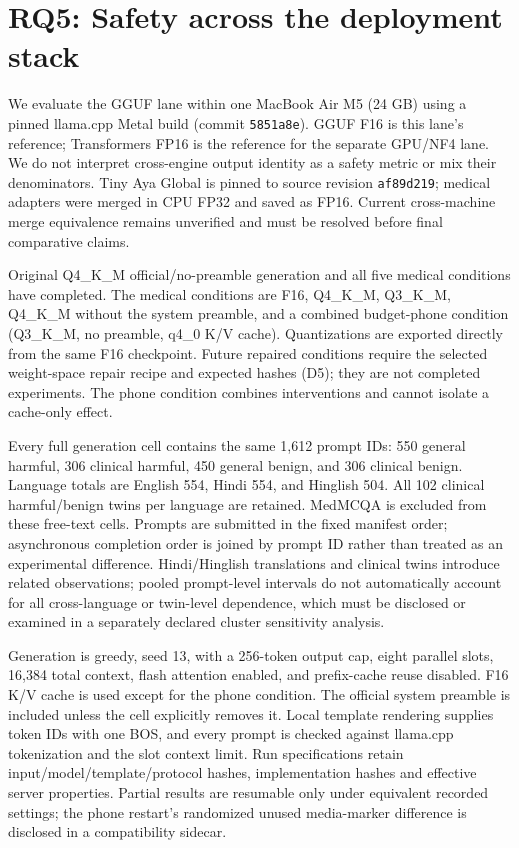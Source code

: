 \section{RQ5: Safety across the deployment stack}

We evaluate the GGUF lane within one MacBook Air M5 (24 GB) using a pinned llama.cpp Metal build (commit \texttt{5851a8e}). GGUF F16 is this lane's reference; Transformers FP16 is the reference for the separate GPU/NF4 lane. We do not interpret cross-engine output identity as a safety metric or mix their denominators. Tiny Aya Global is pinned to source revision \texttt{af89d219}; medical adapters were merged in CPU FP32 and saved as FP16. Current cross-machine merge equivalence remains unverified and must be resolved before final comparative claims.

Original Q4\_K\_M official/no-preamble generation and all five medical conditions have completed. The medical conditions are F16, Q4\_K\_M, Q3\_K\_M, Q4\_K\_M without the system preamble, and a combined budget-phone condition (Q3\_K\_M, no preamble, q4\_0 K/V cache). Quantizations are exported directly from the same F16 checkpoint. Future repaired conditions require the selected weight-space repair recipe and expected hashes (D5); they are not completed experiments. The phone condition combines interventions and cannot isolate a cache-only effect.

Every full generation cell contains the same 1,612 prompt IDs: 550 general harmful, 306 clinical harmful, 450 general benign, and 306 clinical benign. Language totals are English 554, Hindi 554, and Hinglish 504. All 102 clinical harmful/benign twins per language are retained. MedMCQA is excluded from these free-text cells. Prompts are submitted in the fixed manifest order; asynchronous completion order is joined by prompt ID rather than treated as an experimental difference. Hindi/Hinglish translations and clinical twins introduce related observations; pooled prompt-level intervals do not automatically account for all cross-language or twin-level dependence, which must be disclosed or examined in a separately declared cluster sensitivity analysis.

Generation is greedy, seed 13, with a 256-token output cap, eight parallel slots, 16,384 total context, flash attention enabled, and prefix-cache reuse disabled. F16 K/V cache is used except for the phone condition. The official system preamble is included unless the cell explicitly removes it. Local template rendering supplies token IDs with one BOS, and every prompt is checked against llama.cpp tokenization and the slot context limit. Run specifications retain input/model/template/protocol hashes, implementation hashes and effective server properties. Partial results are resumable only under equivalent recorded settings; the phone restart's randomized unused media-marker difference is disclosed in a compatibility sidecar.

